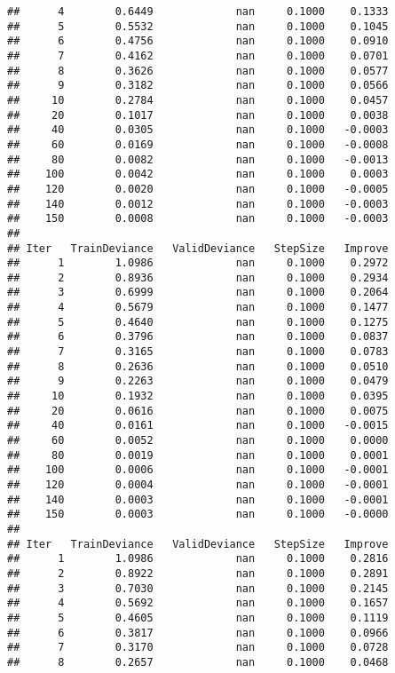 \documentclass[
]{article}
\begin{document}
\begin{verbatim}
##      4        0.6449             nan     0.1000    0.1333
##      5        0.5532             nan     0.1000    0.1045
##      6        0.4756             nan     0.1000    0.0910
##      7        0.4162             nan     0.1000    0.0701
##      8        0.3626             nan     0.1000    0.0577
##      9        0.3182             nan     0.1000    0.0566
##     10        0.2784             nan     0.1000    0.0457
##     20        0.1017             nan     0.1000    0.0038
##     40        0.0305             nan     0.1000   -0.0003
##     60        0.0169             nan     0.1000   -0.0008
##     80        0.0082             nan     0.1000   -0.0013
##    100        0.0042             nan     0.1000    0.0003
##    120        0.0020             nan     0.1000   -0.0005
##    140        0.0012             nan     0.1000   -0.0003
##    150        0.0008             nan     0.1000   -0.0003
## 
## Iter   TrainDeviance   ValidDeviance   StepSize   Improve
##      1        1.0986             nan     0.1000    0.2972
##      2        0.8936             nan     0.1000    0.2934
##      3        0.6999             nan     0.1000    0.2064
##      4        0.5679             nan     0.1000    0.1477
##      5        0.4640             nan     0.1000    0.1275
##      6        0.3796             nan     0.1000    0.0837
##      7        0.3165             nan     0.1000    0.0783
##      8        0.2636             nan     0.1000    0.0510
##      9        0.2263             nan     0.1000    0.0479
##     10        0.1932             nan     0.1000    0.0395
##     20        0.0616             nan     0.1000    0.0075
##     40        0.0161             nan     0.1000   -0.0015
##     60        0.0052             nan     0.1000    0.0000
##     80        0.0019             nan     0.1000    0.0001
##    100        0.0006             nan     0.1000   -0.0001
##    120        0.0004             nan     0.1000   -0.0001
##    140        0.0003             nan     0.1000   -0.0001
##    150        0.0003             nan     0.1000   -0.0000
## 
## Iter   TrainDeviance   ValidDeviance   StepSize   Improve
##      1        1.0986             nan     0.1000    0.2816
##      2        0.8922             nan     0.1000    0.2891
##      3        0.7030             nan     0.1000    0.2145
##      4        0.5692             nan     0.1000    0.1657
##      5        0.4605             nan     0.1000    0.1119
##      6        0.3817             nan     0.1000    0.0966
##      7        0.3170             nan     0.1000    0.0728
##      8        0.2657             nan     0.1000    0.0468

\end{verbatim}
\end{document}
